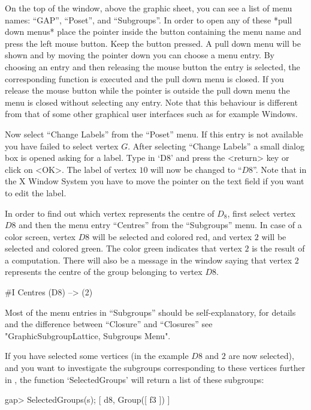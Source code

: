 On the top of the window, above the graphic sheet, you  can see a list
of  menu names:  ``GAP'',  ``Poset'', and ``Subgroups''.   In order to
open  any of  these *pull down  menus*  place  the pointer inside  the
button containing the menu name and press the left mouse button.  Keep
the button pressed.  A pull down menu will  be shown and by moving the
pointer down  you can choose  a menu entry.   By choosing an entry and
then  releasing    the mouse   button the   entry    is  selected, the
corresponding function is  executed and the  pull down menu is closed. 
If you release the mouse button while the  pointer is outside the pull
down  menu the menu  is closed without selecting  any entry. Note that
this   behaviour is different from that   of some other graphical user
interfaces such as for example Windows.

Now  select ``Change Labels'' from the  ``Poset'' menu.  If this entry
is not   available  you have  failed to    select vertex  $G$.   After
selecting ``Change Labels'' a small dialog box is  opened asking for a
label.  Type in `D8' and press the <return> key or click on <OK>.  The
label of vertex $10$ will now be changed to ``$D8$''. Note that in the
X Window System you have to move the pointer on  the text field if you
want to edit the label.

In  order to find   out which vertex  represents the  centre of $D_8$,
first select vertex $D8$ and then the menu  entry ``Centres'' from the
``Subgroups'' menu.  In  case of a color  screen, vertex  $D8$ will be
selected and colored red, and vertex  $2$ will be selected and colored
green.  The color  green indicates that vertex $2$  is the result of a
computation.  There will also be a message in the {\GAP} window saying
that vertex $2$ represents the centre of the group belonging to vertex
$D8$.

\begintt
#I  Centres (D8) --> (2)
\endtt

Most of  the menu entries  in ``Subgroups'' should be self-explanatory, for
details and  the   difference   between  ``Closure''  and    ``Closures'' see
"GraphicSubgroupLattice, Subgroups Menu".

If you have selected some vertices (in the example $D8$ and $2$ are now
selected), and you want to investigate the subgroups corresponding to these
vertices further in {\GAP}, the function `SelectedGroups' will return a
list of these subgroups:

\label{gapxgap}
\begintt
gap> SelectedGroups(s);
[ d8, Group([ f3 ]) ]
\endtt

